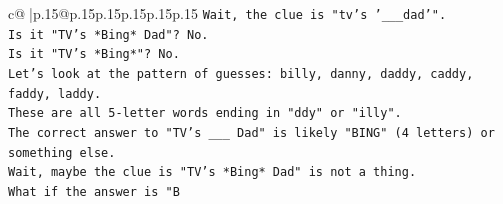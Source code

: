 \documentclass{article}
\begin{document}
{\begin{supertabular}{c@{$\;$}|p{.15\linewidth}@{}p{.15\linewidth}p{.15\linewidth}p{.15\linewidth}p{.15\linewidth}p{.15\linewidth}}
{{{\texttt{Wait, the clue is "tv's '\_\_\_dad'".} \\
\texttt{Is it "TV's *Bing* Dad"? No.} \\
\texttt{Is it "TV's *Bing*"? No.} \\
\texttt{Let's look at the pattern of guesses: billy, danny, daddy, caddy, faddy, laddy.} \\
\texttt{These are all 5{-}letter words ending in "ddy" or "illy".} \\
\texttt{The correct answer to "TV's \_\_\_ Dad" is likely "BING" (4 letters) or something else.} \\
\texttt{Wait, maybe the clue is "TV's *Bing* Dad" is not a thing.} \\
\texttt{What if the answer is "B} \\
            }
        }
    }
     \\ \\

\end{supertabular}
}
\end{document}
